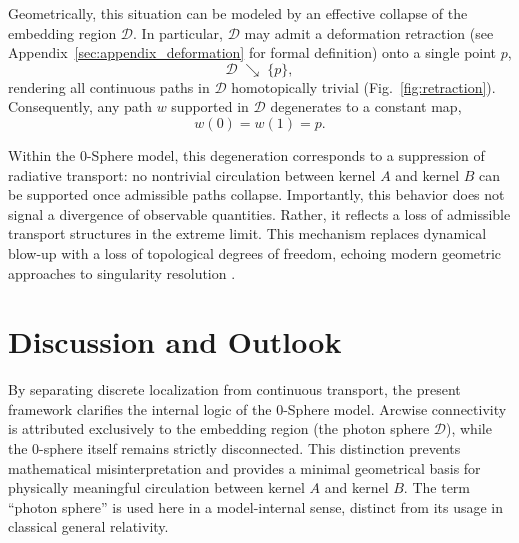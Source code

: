 \documentclass[%
 reprint,
 amsmath,amssymb,
 aps,
 prb,
]{revtex4-2}
\numberwithin{equation}{section}
\begin{document}
Geometrically, this situation can be modeled by an effective collapse of the embedding region $\mathcal{D}$.
In particular, $\mathcal{D}$ may admit a deformation retraction (see Appendix~\ref{sec:appendix_deformation} for formal definition) \cite{Munkres2000} onto a single point $p$,
\begin{equation}
\mathcal{D} \;\searrow\; \{p\},
\end{equation}
rendering all continuous paths in $\mathcal{D}$ homotopically trivial (Fig.~\ref{fig:retraction}).
Consequently, any path $w$ supported in $\mathcal{D}$ degenerates to a constant map,
\begin{equation}
w(0)=w(1)=p .
\end{equation}

Within the 0-Sphere model, this degeneration corresponds to a suppression of radiative transport:
no nontrivial circulation between kernel $A$ and kernel $B$ can be supported once admissible paths collapse.
Importantly, this behavior does not signal a divergence of observable quantities.
Rather, it reflects a loss of admissible transport structures in the extreme limit.
This mechanism replaces dynamical blow-up with a loss of topological degrees of freedom, echoing modern geometric approaches to singularity resolution \cite{Penrose1965,Ashtekar2005}.


\section{Discussion and Outlook}
\label{sec:discussion}

By separating discrete localization from continuous transport, the present framework clarifies the internal logic of the 0-Sphere model.
Arcwise connectivity is attributed exclusively to the embedding region (the photon sphere $\mathcal{D}$), while the 0-sphere itself remains strictly disconnected.
This distinction prevents mathematical misinterpretation and provides a minimal geometrical basis for physically meaningful circulation between kernel $A$ and kernel $B$.
The term ``photon sphere'' is used here in a model-internal sense, distinct from its usage in classical general relativity.
\end{document}
